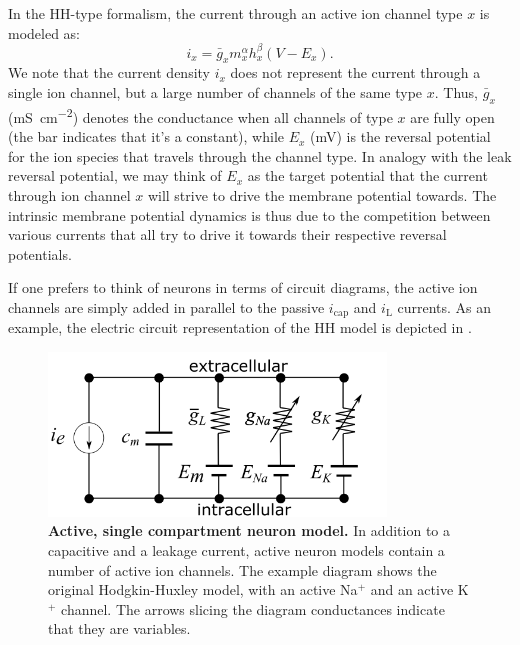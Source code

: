 In the HH-type formalism, the current through an active ion channel type $x$ is modeled as:
\begin{equation}
i_x = \bar{g}_x m_x^{\alpha} h_x^{\beta}(V-E_x).
\label{eq:Neuron:HHform}
\end{equation}
We note that the current density $i_x$ does not represent the current through a single ion channel, but a large number of channels of the same type $x$. Thus, $\bar{g}_x$ (\si{\milli\siemens\per\square\centi\metre}) denotes the conductance when all channels of type $x$ are fully open (the bar indicates that it's a constant),
 while $E_x$ (\si{\milli\volt}) is the reversal potential for the ion species that travels through the channel type. In analogy with the leak reversal potential, we may think of $E_x$ as the target potential that the current through ion channel $x$ will strive to drive the membrane potential towards. The intrinsic membrane potential dynamics is thus due to the competition between various currents that all try to drive it towards their respective reversal potentials. 

If one prefers to think of neurons in terms of circuit diagrams, the active ion channels are simply added in parallel to the passive $i_{\mathrm{cap}}$ and $i_{\mathrm{L}}$ currents. As an example, the electric circuit representation of the HH model is depicted in .

\begin{figure}[!ht]
\begin{center}
\includegraphics[width=0.8\textwidth]{Figures/Neuron/HHmodel.png}
\end{center}
\caption[]{\textbf{Active, single compartment neuron model.}  In addition to a capacitive and a leakage current, active neuron models contain a number of active ion channels. The example diagram shows the original Hodgkin-Huxley model, with an active Na$^+$ and an active K$^+$ channel. The arrows slicing the diagram conductances indicate that they are variables.}
\label{fig:Neuron:HH}
\end{figure}

